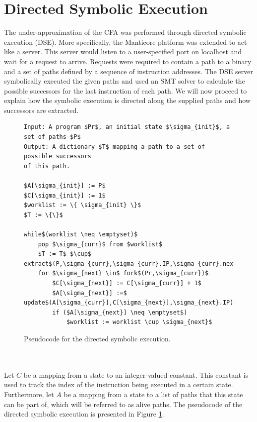 \documentclass{kththesis}
\newcommand{\fbcomment}[1]{{#1}}
\renewcommand{\fbcomment}[1]{}
\begin{document}
\section{Directed Symbolic Execution}\label{sec:DSEPseudo}
\fbcomment{\color{red}Goal: Describe the theory behind how the directed symbolic execution was performed and how successor to locations were extracted.}
The under-approximation of the CFA was performed through directed symbolic execution (DSE). More specifically, the Manticore platform was extended to act like a server. This server would listen to a user-specified port on localhost and wait for a request to arrive. Requests were required to contain a path to a binary and a set of paths defined by a sequence of instruction addresses. The DSE server symbolically executed the given paths and used an SMT solver to calculate the possible successors for the last instruction of each path. We will now proceed to explain how the symbolic execution is directed along the supplied paths and how successors are extracted.
\begin{figure}[!htbp]
    \centering
\begin{algorithmFrame}
\begin{lstlisting}[style=algorithm]
Input: A program $Pr$, an initial state $\sigma_{init}$, a set of paths $P$
Output: A dictionary $T$ mapping a path to a set of possible successors 
of this path.

$A[\sigma_{init}] := P$
$C[\sigma_{init}] := 1$
$worklist := \{ \sigma_{init} \}$
$T := \{\}$

while$(worklist \neq \emptyset)$
    pop $\sigma_{curr}$ from $worklist$
    $T := T$ $\cup$ extract$(P,\sigma_{curr},\sigma_{curr}.IP,\sigma_{curr}.nextIP,C[\sigma_{curr}])$
    for $\sigma_{next} \in$ fork$(Pr,\sigma_{curr})$
        $C[\sigma_{next}] := C[\sigma_{curr}] + 1$
        $A[\sigma_{next}] :=$ update$(A[\sigma_{curr}],C[\sigma_{next}],\sigma_{next}.IP)$
        if ($A[\sigma_{next}] \neq \emptyset$)
            $worklist := worklist \cup \sigma_{next}$
\end{lstlisting}
\end{algorithmFrame}
\caption[Pseudocode for the directed symbolic execution.]{Pseudocode for the directed symbolic execution.}
    \label{fig:DSEAlgorithm}
\end{figure}
\\ \\
Let $C$ be a mapping from a state to an integer-valued constant. This constant is used to track the index of the instruction being executed in a certain state. Furthermore, let $A$ be a mapping from a state to a list of paths that this state can be part of, which will be referred to as alive paths. The pseudocode of the directed symbolic execution is presented in Figure \ref{fig:DSEAlgorithm}.
\end{document}
